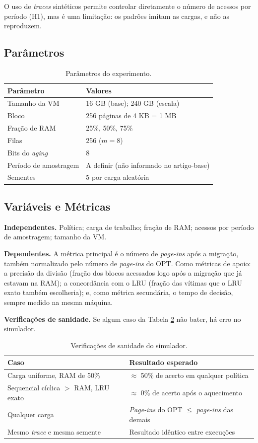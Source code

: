\documentclass[12pt]{article}
\begin{document}
O uso de \textit{traces} sintéticos permite controlar diretamente o número de acessos por período (H1), mas é uma limitação: os padrões imitam as cargas, e não as reproduzem.

\subsection{Parâmetros}

\begin{table}[h]
\centering
\caption{Parâmetros do experimento.}
\label{tab:parametros}
\begin{tabular}{ll}
\toprule
Parâmetro & Valores \\
\midrule
Tamanho da VM & 16 GB (base); 240 GB (escala) \\
Bloco & 256 páginas de 4 KB = 1 MB \\
Fração de RAM & 25\%, 50\%, 75\% \\
Filas & 256 ($m=8$) \\
Bits do \textit{aging} & 8 \\
Período de amostragem & A definir (não informado no artigo-base) \\
Sementes & 5 por carga aleatória \\
\bottomrule
\end{tabular}
\end{table}

\subsection{Variáveis e Métricas}

\textbf{Independentes.} Política; carga de trabalho; fração de RAM; acessos por período de amostragem; tamanho da VM.

\textbf{Dependentes.} A métrica principal é o número de \textit{page-ins} após a migração, também normalizado pelo número de \textit{page-ins} do OPT. Como métricas de apoio: a precisão da divisão (fração dos blocos acessados logo após a migração que já estavam na RAM); a concordância com o LRU (fração das vítimas que o LRU exato também escolheria); e, como métrica secundária, o tempo de decisão, sempre medido na mesma máquina.

\textbf{Verificações de sanidade.} Se algum caso da Tabela \ref{tab:sanidade} não bater, há erro no simulador.

\begin{table}[h]
\centering
\caption{Verificações de sanidade do simulador.}
\label{tab:sanidade}
\begin{tabular}{ll}
\toprule
Caso & Resultado esperado \\
\midrule
Carga uniforme, RAM de 50\% & $\approx$ 50\% de acerto em qualquer política \\
Sequencial cíclica $>$ RAM, LRU exato & $\approx$ 0\% de acerto após o aquecimento \\
Qualquer carga & \textit{Page-ins} do OPT $\leq$ \textit{page-ins} das demais \\
Mesmo \textit{trace} e mesma semente & Resultado idêntico entre execuções \\
\bottomrule
\end{tabular}
\end{table}
\end{document}
